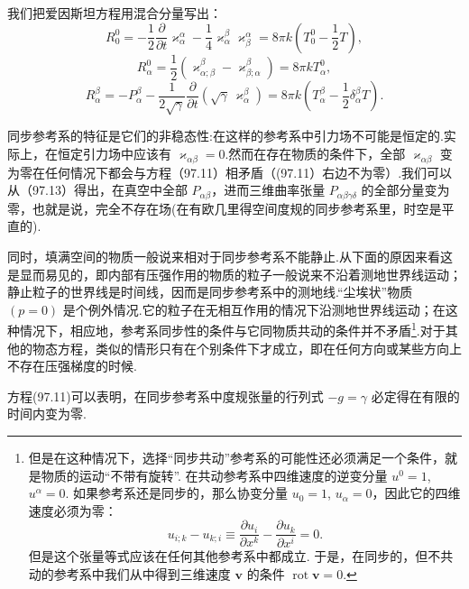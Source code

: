 我们把爱因斯坦方程用混合分量写出：
\begin{equation}
  R^0_0=-\frac{1}{2}\frac{\partial}{\partial t}\varkappa_{\alpha}^{\alpha}
  -\frac{1}{4}\varkappa_{\alpha}^{\beta}\varkappa_{\beta}^{\alpha}
  =8\pi k\left(T^0_0-\frac{1}{2}T\right),
\end{equation}
\begin{equation}
  R^0_{\alpha}=\frac{1}{2}\left(\varkappa^{\beta}_{\alpha;\beta}
  -\varkappa^{\beta}_{\beta;\alpha}\right)=8\pi kT^0_{\alpha},
\end{equation}
\begin{equation}
  R^{\beta}_{\alpha}=-P^{\beta}_{\alpha}
  -\frac{1}{2\sqrt{\gamma}}\frac{\partial}{\partial t}
  \left(\sqrt{\gamma}\,\varkappa^{\beta}_{\alpha}\right)
  =8\pi k\left(T^{\beta}_{\alpha}-\frac{1}{2}\delta^{\beta}_{\alpha}T\right).
\end{equation}

同步参考系的特征是它们的非稳态性:在这样的参考系中引力场不可能是恒定的.实际上，在恒定引力场中应该有 $\varkappa_{\alpha\beta}=0$.然而在存在物质的条件下，全部 $\varkappa_{\alpha\beta}$ 变为零在任何情况下都会与方程（97.11）相矛盾（(97.11）右边不为零）.我们可以从（97.13）得出，在真空中全部 $P_{\alpha\beta}$，进而三维曲率张量 $P_{\alpha\beta\gamma\delta}$ 的全部分量变为零，也就是说，完全不存在场(在有欧几里得空间度规的同步参考系里，时空是平直的).

同时，填满空间的物质一般说来相对于同步参考系不能静止.从下面的原因来看这是显而易见的，即内部有压强作用的物质的粒子一般说来不沿着测地世界线运动；静止粒子的世界线是时间线，因而是同步参考系中的测地线.“尘埃状”物质 $(p=0)$ 是个例外情况.它的粒子在无相互作用的情况下沿测地世界线运动；在这种情况下，相应地，参考系同步性的条件与它同物质共动的条件并不矛盾\footnote{但是在这种情况下，选择“同步共动”参考系的可能性还必须满足一个条件，就是物质的运动“不带有旋转”. 在共动参考系中四维速度的逆变分量 $u^0=1$, $u^{\alpha}=0$. 如果参考系还是同步的，那么协变分量 $u_0=1$, $u_{\alpha}=0$，因此它的四维速度必须为零：
\begin{equation*}
  u_{i;k}-u_{k;i}\equiv\frac{\partial u_i}{\partial x^k}
  -\frac{\partial u_k}{\partial x^i}=0.
\end{equation*}
但是这个张量等式应该在任何其他参考系中都成立. 于是，在同步的，但不共动的参考系中我们从中得到三维速度 $\boldsymbol{v}$ 的条件 $\operatorname{rot}\boldsymbol{v}=0$.}.对于其他的物态方程，类似的情形只有在个别条件下才成立，即在任何方向或某些方向上不存在压强梯度的时候.

方程(97.11)可以表明，在同步参考系中度规张量的行列式 $-g=\gamma$ 必定得在有限的时间内变为零.

